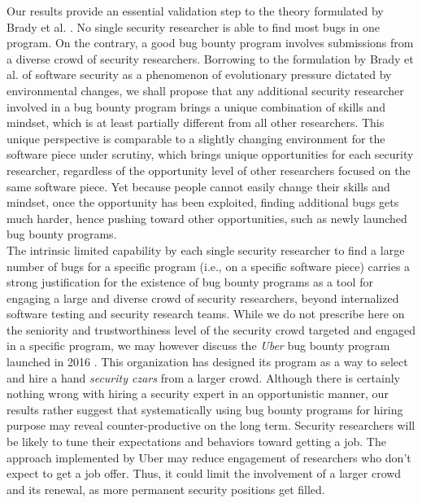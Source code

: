 Our results provide an essential validation step to the theory formulated by Brady et al. \cite{brady1999murphy}. No single security researcher is able to find most bugs in one program. On the contrary, a good bug bounty program involves submissions from a diverse crowd of security researchers. Borrowing to the formulation by Brady et al. of software security as a phenomenon of evolutionary pressure dictated by environmental changes, we shall propose that any additional security researcher involved in a bug bounty program brings a unique combination of skills and mindset, which is at least partially different from all other researchers. This unique perspective is comparable to a slightly changing environment for the software piece under scrutiny, which brings unique opportunities for each security researcher, regardless of the opportunity level of other researchers focused on the same software piece. Yet because people cannot easily change their skills and mindset, once the opportunity has been exploited, finding additional bugs gets much harder, hence pushing toward other opportunities, such as newly launched bug bounty programs.\\

The intrinsic limited capability by each single security researcher to find a large number of bugs for a specific program (i.e., on a specific software piece) carries a strong justification for the existence of bug bounty programs as a tool for engaging a large and diverse crowd of security researchers, beyond internalized software testing and security research teams. While we do not prescribe here on the seniority and trustworthiness level of the security crowd targeted and engaged in a specific program, we may however discuss the {\it Uber} bug bounty program launched in 2016 \cite{moussouris2016}. This organization has designed its program as a way to select and hire a hand {\it security czars} from a larger crowd. Although there is certainly nothing wrong with hiring a security expert in an opportunistic manner, our results rather suggest that systematically using bug bounty programs for hiring purpose may reveal counter-productive on the long term. Security researchers will be likely to tune their expectations and behaviors toward getting a job. The approach implemented by Uber may reduce engagement of researchers who don't expect to get a job offer. Thus, it could limit the involvement of a larger crowd and its renewal, as more permanent security positions get filled. \\

